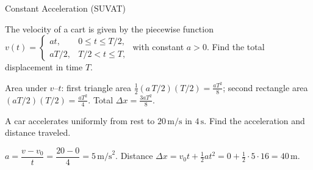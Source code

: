 \begin{KnowledgePoint}{Constant Acceleration (SUVAT) \Core}
  \KPProblems
  \begin{cheatproblem}
  The velocity of a cart is given by the piecewise function $v(t)=\begin{cases} a t, & 0\le t\le T/2,\\ aT/2, & T/2< t\le T,\end{cases}$ with constant $a>0$. Find the total displacement in time $T$.
  \begin{solutionbox}
  Area under $v$--$t$: first triangle area $\tfrac12(a\,T/2)(T/2)=\tfrac{aT^2}{8}$; second rectangle area $(aT/2)(T/2)=\tfrac{aT^2}{4}$. Total $\Delta x=\tfrac{3aT^2}{8}$.
  \end{solutionbox}
  \end{cheatproblem}
\begin{cheatproblem}
  A car accelerates uniformly from rest to $20\,\text{m/s}$ in $4\,\text{s}$. Find the acceleration and distance traveled.
\begin{solutionbox}
  $a=\dfrac{v-v_0}{t}=\dfrac{20-0}{4}=5\,\text{m/s}^2$. Distance $\Delta x=v_0 t+\tfrac12 a t^2=0+\tfrac12\cdot5\cdot16=40\,\text{m}$.
  \end{solutionbox}
  \end{cheatproblem}
\end{KnowledgePoint}

